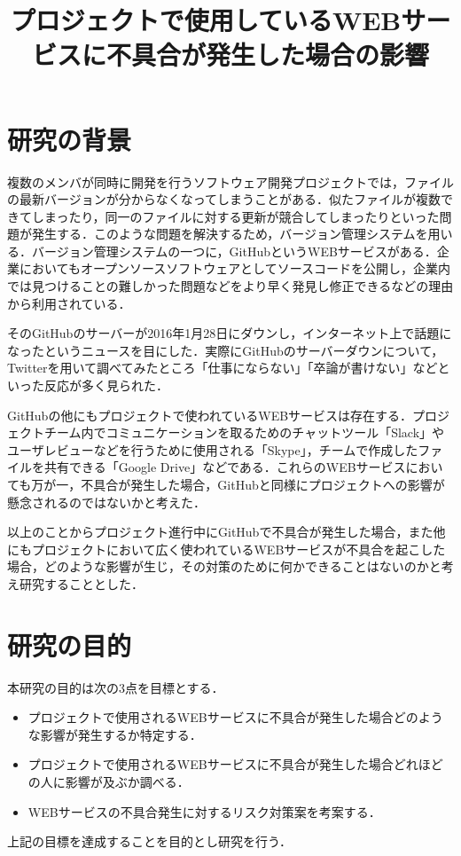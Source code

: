 \documentclass[uplatex,twocolumn,dvipdfmx]{jsarticle}
\title{\vspace{-5mm}\fontsize{14pt}{0pt}\selectfont プロジェクトで使用しているWEBサービスに不具合が発生した場合の影響}
\author{\normalsize }
\date{}
\begin{document}
\fontsize{10.5pt}{\baselineskip}\selectfont
\maketitle





\section{研究の背景}
複数のメンバが同時に開発を行うソフトウェア開発プロジェクトでは，ファイルの最新バージョンが分からなくなってしまうことがある．似たファイルが複数できてしまったり，同一のファイルに対する更新が競合してしまったりといった問題が発生する．このような問題を解決するため，バージョン管理システムを用いる．バージョン管理システムの一つに，GitHubというWEBサービスがある．企業においてもオープンソースソフトウェアとしてソースコードを公開し，企業内では見つけることの難しかった問題などをより早く発見し修正できるなどの理由から利用されている\cite{01}．

そのGitHubのサーバーが2016年1月28日にダウンし，インターネット上で話題になったというニュースを目にした．実際にGitHubのサーバーダウンについて，Twitterを用いて調べてみたところ「仕事にならない」「卒論が書けない」などといった反応が多く見られた\cite{02}．

GitHubの他にもプロジェクトで使われているWEBサービスは存在する．プロジェクトチーム内でコミュニケーションを取るためのチャットツール「Slack」やユーザレビューなどを行うために使用される「Skype」，チームで作成したファイルを共有できる「Google Drive」などである．これらのWEBサービスにおいても万が一，不具合が発生した場合，GitHubと同様にプロジェクトへの影響が懸念されるのではないかと考えた．

以上のことからプロジェクト進行中にGitHubで不具合が発生した場合，また他にもプロジェクトにおいて広く使われているWEBサービスが不具合を起こした場合，どのような影響が生じ，その対策のために何かできることはないのかと考え研究することとした．

\section{研究の目的}
本研究の目的は次の3点を目標とする．
\begin{itemize}
 \item プロジェクトで使用されるWEBサービスに不具合が発生した場合どのような影響が発生するか特定する．
 \item プロジェクトで使用されるWEBサービスに不具合が発生した場合どれほどの人に影響が及ぶか調べる．
 \item WEBサービスの不具合発生に対するリスク対策案を考案する．
\end{itemize}
上記の目標を達成することを目的とし研究を行う．
\end{document}
